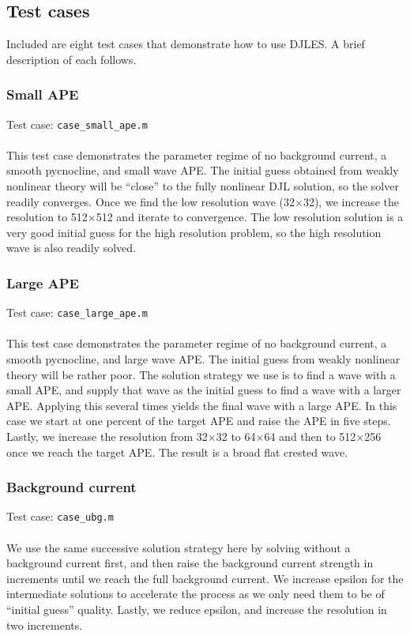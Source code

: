 \documentclass[letterpaper]{article}
\begin{document}
\subsection{Test cases}
Included are eight test cases that demonstrate how to use DJLES. A brief description of each follows.

\subsubsection{Small APE}
Test case: \verb"case_small_ape.m" \\\\
This test case demonstrates the parameter regime of no background current, a smooth pycnocline, and small wave APE.
The initial guess obtained from weakly nonlinear theory will be ``close'' to the fully nonlinear DJL solution, so the solver readily converges.
Once we find the low resolution wave (32$\times$32), we increase the resolution to 512$\times$512 and iterate to convergence.
The low resolution solution is a very good initial guess for the high resolution problem, so the high resolution wave is also readily solved.

\subsubsection{Large APE}
Test case: \verb"case_large_ape.m" \\\\
This test case demonstrates the parameter regime of no background current, a smooth pycnocline, and large wave APE.
The initial guess from weakly nonlinear theory will be rather poor. 
The solution strategy we use is to find a wave with a small APE, and supply that wave as the initial guess to find a wave with a larger APE.
Applying this several times yields the final wave with a large APE.
In this case we start at one percent of the target APE and raise the APE in five steps.
Lastly, we increase the resolution from 32$\times$32 to 64$\times$64 and then to 512$\times$256 once we reach the target APE.
The result is a broad flat crested wave.

\subsubsection{Background current}
Test case: \verb"case_ubg.m" \\\\
We use the same successive solution strategy here by solving without a background current first,
and then raise the background current strength in increments until we reach the full background current.
We increase epsilon for the intermediate solutions to accelerate the process as we only need them to be of ``initial guess'' quality.
Lastly, we reduce epsilon, and increase the resolution in two increments.
\end{document}
